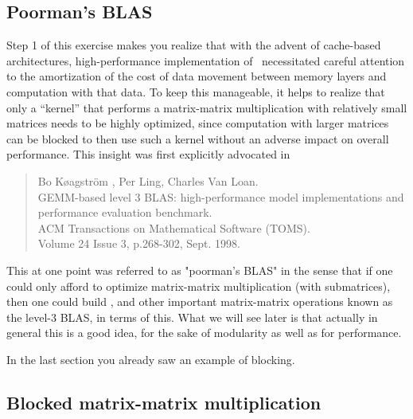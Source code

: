 \subsection{Poorman's BLAS}

Step 1 of this exercise makes you realize that
with the advent of cache-based architectures, high-performance implementation of \Gemm\ necessitated careful attention to 
the amortization of the cost of data movement between memory layers and computation with that data.
To keep this manageable, it helps to realize that only a ``kernel'' that performs a  matrix-matrix multiplication with relatively small matrices needs to be highly optimized, since
computation with larger matrices can be blocked to then use such a kernel without an adverse impact on overall performance.  This 
insight was first explicitly advocated in~\cite{poorman_journal}
\begin{quote}
	Bo K\o{a}gstr\"{o}m , Per Ling, Charles Van Loan.\\
	GEMM-based level 3 BLAS: high-performance model implementations and performance evaluation benchmark. \\
	ACM Transactions on Mathematical Software (TOMS). \\
	Volume 24 Issue 3, p.268-302, Sept. 1998.
\end{quote}
This at one point was referred to as "poorman's BLAS" in the sense that if one could only afford to optimize matrix-matrix multiplication (with submatrices), then one could build \Gemm, and other important matrix-matrix operations known as the level-3 BLAS, in terms of this.  What we will see later is that actually in general this is a good idea, for the sake of modularity as well as for performance.

In the last section you already saw an example of blocking.

\subsection{Blocked matrix-matrix multiplication}

